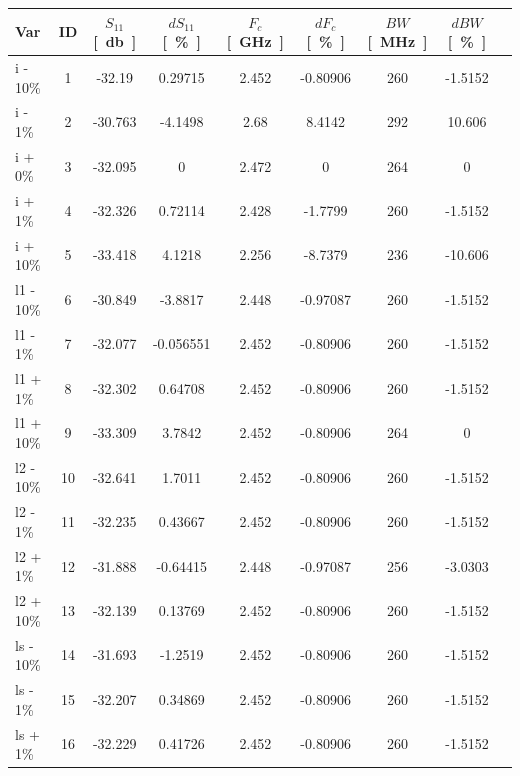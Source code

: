 \documentclass[Deriaz_Traiber_Labo02]{subfiles}
\begin{document}
\begin{table}[H]
\centering
\begin{tabular}{|l|c|cc|cc|cc|c|}\hline
	Var 		   	& ID  &  $S_{11}$ \si{[\decibel]} &  $dS_{11}$ \si{[\percent]}   &  $F_c$ \si{[\giga\hertz]} &   $dF_c$ \si{[\percent]}  & $BW$\si{[\mega\hertz]} &   $dBW$ \si{[\percent]}  \\ \hline\hline
	
	i - 10\% 	& 1   &  -32.19   &   0.29715   & 2.452   &  -0.80906  &   260   &   -1.5152\\
    i - 1\%     & 2   &  -30.763  &    -4.1498  &   2.68  &     8.4142 &    292  &     10.606\\ 
    	i + 0\%       & 3   &  -32.095  &          0  &  2.472  &          0 &    264  &        0\\
    i + 1\%     & 4   &  -32.326  &    0.72114  &  2.428  &    -1.7799 &    260  &    -1.5152\\
    i + 10\%    & 5   &  -33.418  &     4.1218  &  2.256  &    -8.7379 &    236  &    -10.606\\\hline
    l1 - 10\%   & 6   &  -30.849  &    -3.8817  &  2.448  &   -0.97087 &    260  &    -1.5152\\
    l1 - 1\%    & 7   &  -32.077  &  -0.056551  &  2.452  &   -0.80906 &    260  &    -1.5152\\
    l1 + 1\%    & 8   &  -32.302  &    0.64708  &  2.452  &   -0.80906 &    260  &    -1.5152\\
    l1 + 10\%   & 9   &  -33.309  &     3.7842  &  2.452  &   -0.80906 &    264  &          0\\\hline
    l2 - 10\%   & 10  &  -32.641  &     1.7011  &  2.452  &   -0.80906 &    260  &    -1.5152\\
    l2 - 1\%    & 11  &  -32.235  &    0.43667  &  2.452  &   -0.80906 &    260  &    -1.5152\\
    l2 + 1\%    & 12  &  -31.888  &   -0.64415  &  2.448  &   -0.97087 &    256  &    -3.0303\\
    l2 + 10\%   & 13  &  -32.139  &    0.13769  &  2.452  &   -0.80906 &    260  &    -1.5152\\\hline
    ls - 10\%   & 14  &  -31.693  &    -1.2519  &  2.452  &   -0.80906 &    260  &    -1.5152\\
    ls - 1\%    & 15  &  -32.207  &    0.34869  &  2.452  &   -0.80906 &    260  &    -1.5152\\
    ls + 1\%    & 16  &  -32.229  &    0.41726  &  2.452  &   -0.80906 &    260  &    -1.5152\\

\end{tabular}
\end{table}
\end{document}
